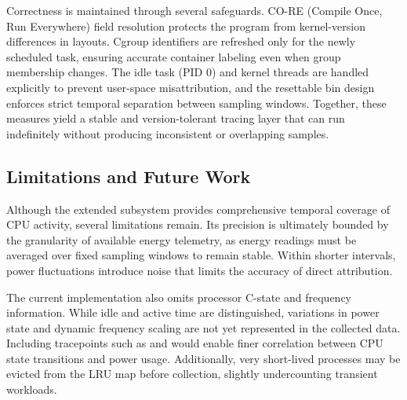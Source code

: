 Correctness is maintained through several safeguards.  
CO-RE (Compile Once, Run Everywhere) field resolution protects the program from kernel-version differences in  layouts.  
Cgroup identifiers are refreshed only for the newly scheduled task, ensuring accurate container labeling even when group membership changes.  
The idle task (PID 0) and kernel threads are handled explicitly to prevent user-space misattribution, and the resettable bin design enforces strict temporal separation between sampling windows.  
Together, these measures yield a stable and version-tolerant tracing layer that can run indefinitely without producing inconsistent or overlapping samples.

\subsection{Limitations and Future Work}
\label{subsec:ebpf-limitations}

Although the extended  subsystem provides comprehensive temporal coverage of CPU activity, several limitations remain.  
Its precision is ultimately bounded by the granularity of available energy telemetry, as energy readings must be averaged over fixed sampling windows to remain stable.  
Within shorter intervals, power fluctuations introduce noise that limits the accuracy of direct attribution.  

The current implementation also omits processor C-state and frequency information.  
While idle and active time are distinguished, variations in power state and dynamic frequency scaling are not yet represented in the collected data.  
Including tracepoints such as  and  would enable finer correlation between CPU state transitions and power usage.  
Additionally, very short-lived processes may be evicted from the LRU map before collection, slightly undercounting transient workloads.